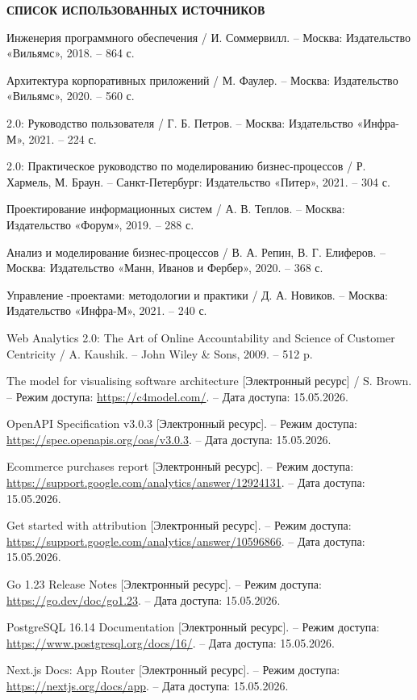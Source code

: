 \clearpage
\begin{center}
    \textbf{СПИСОК ИСПОЛЬЗОВАННЫХ ИСТОЧНИКОВ}
\end{center}

\begin{enumerate}[leftmargin=0pt,labelwidth=1.1cm,labelsep=0.3cm,itemindent=!,align=left,itemsep=0pt,parsep=0pt,topsep=0pt,label={[\arabic*]}]
    \item Инженерия программного обеспечения / И. Соммервилл. – Москва: Издательство «Вильямс», 2018. – 864 с.
    \item Архитектура корпоративных приложений / М. Фаулер. – Москва: Издательство «Вильямс», 2020. – 560 с.
    \item {} 2.0: Руководство пользователя / Г. Б. Петров. – Москва: Издательство «Инфра-М», 2021. – 224 с.
    \item {} 2.0: Практическое руководство по моделированию бизнес-процессов / Р. Хармель, М. Браун. – Санкт-Петербург: Издательство «Питер», 2021. – 304 с.
    \item Проектирование информационных систем / А. В. Теплов. – Москва: Издательство «Форум», 2019. – 288 с.
    \item Анализ и моделирование бизнес-процессов / В. А. Репин, В. Г. Елиферов. – Москва: Издательство «Манн, Иванов и Фербер», 2020. – 368 с.
    \item Управление -проектами: методологии и практики / Д. А. Новиков. – Москва: Издательство «Инфра-М», 2021. – 240 с.
    \item Web Analytics 2.0: The Art of Online Accountability and Science of Customer Centricity / A. Kaushik. – John Wiley \& Sons, 2009. – 512 p.
    \item The  model for visualising software architecture [Электронный ресурс] / S. Brown. – Режим доступа: \url{https://c4model.com/}. – Дата доступа: 15.05.2026.
    \item OpenAPI Specification v3.0.3 [Электронный ресурс]. – Режим доступа: \url{https://spec.openapis.org/oas/v3.0.3}. – Дата доступа: 15.05.2026.
    \item {} Ecommerce purchases report [Электронный ресурс]. – Режим доступа: \url{https://support.google.com/analytics/answer/12924131}. – Дата доступа: 15.05.2026.
    \item Get started with attribution [Электронный ресурс]. – Режим доступа: \url{https://support.google.com/analytics/answer/10596866}. – Дата доступа: 15.05.2026.
    \item Go 1.23 Release Notes [Электронный ресурс]. – Режим доступа: \url{https://go.dev/doc/go1.23}. – Дата доступа: 15.05.2026.
    \item PostgreSQL 16.14 Documentation [Электронный ресурс]. – Режим доступа: \url{https://www.postgresql.org/docs/16/}. – Дата доступа: 15.05.2026.
    \item Next.js Docs: App Router [Электронный ресурс]. – Режим доступа: \url{https://nextjs.org/docs/app}. – Дата доступа: 15.05.2026.
\end{enumerate}
